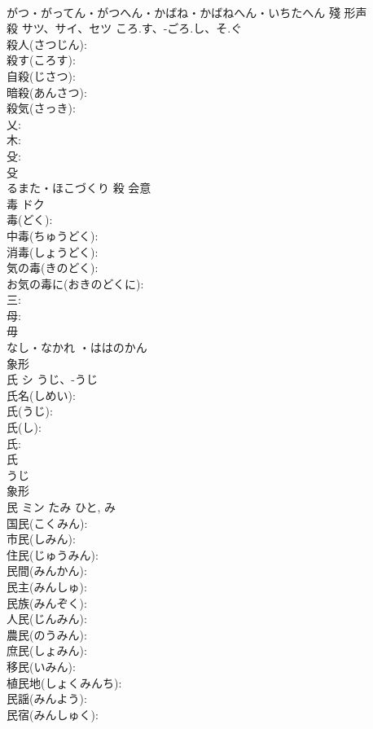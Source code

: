 \documentclass[8pt]{extreport}
\begin{document}
\begin{CJK}{UTF8}{min}
\\	がつ・がってん・がつへん・かばね・かばねへん・いちたへん	殘	形声 
\\	殺	サツ、サイ、セツ	ころ.す、-ごろ.し、そ.ぐ		
\\	殺人(さつじん): 
\\	殺す(ころす): 
\\	自殺(じさつ): 
\\	暗殺(あんさつ): 
\\	殺気(さっき): 
\\	乂: 
\\	木: 
\\	殳: 
\\	殳	
\\	るまた・ほこづくり	殺	会意 
\\	毒	ドク			
\\	毒(どく): 
\\	中毒(ちゅうどく): 
\\	消毒(しょうどく): 
\\	気の毒(きのどく): 
\\	お気の毒に(おきのどくに): 
\\	三: 
\\	母: 
\\	毋	
\\	なし・なかれ ・ははのかん	
\\	象形 
\\	氏	シ	うじ、-うじ		
\\	氏名(しめい): 
\\	氏(うじ): 
\\	氏(し): 
\\	氏: 
\\	氏	
\\	うじ	
\\	象形 
\\	民	ミン	たみ	ひと, み	
\\	国民(こくみん): 
\\	市民(しみん): 
\\	住民(じゅうみん): 
\\	民間(みんかん): 
\\	民主(みんしゅ): 
\\	民族(みんぞく): 
\\	人民(じんみん): 
\\	農民(のうみん): 
\\	庶民(しょみん): 
\\	移民(いみん): 
\\	植民地(しょくみんち): 
\\	民謡(みんよう): 
\\	民宿(みんしゅく): 

\end{CJK}
\end{document}
